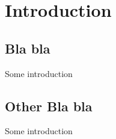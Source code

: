 \documentclass[a4paper,10pt,notitlepage]{report}
\begin{document}
\clearpage
\thispagestyle{empty}
\tableofcontents

\chapter{Introduction}
\section{Bla bla}
Some introduction
\section{Other Bla bla}
Some introduction~\cite{STAR2}





% 
% 
% 
% 


{}

\end{document}

